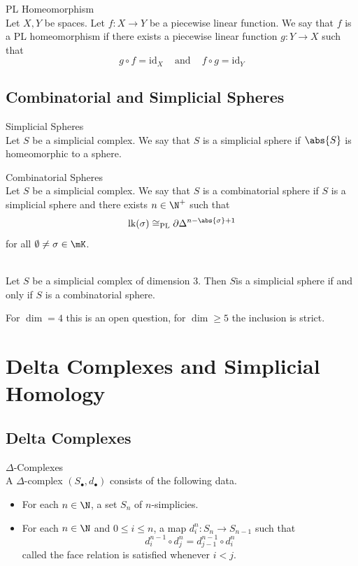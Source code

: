 \documentclass[a4paper]{article}
\begin{document}
\begin{defn}{PL Homeomorphism}{}\\
Let $X,Y$ be spaces. Let $f:X\to Y$ be a piecewise linear function. We say that $f$ is a PL homeomorphism if there exists a piecewise linear function $g:Y\to X$ such that $$g\circ f=\text{id}_X\;\;\;\text{ and }\;\;\;f\circ g=\text{id}_Y$$
\end{defn}

\subsection{Combinatorial and Simplicial Spheres}
\begin{defn}{Simplicial Spheres}{}\\
Let $S$ be a simplicial complex. We say that $S$ is a simplicial sphere if $\abs{S}$ is homeomorphic to a sphere. 
\end{defn}

\begin{defn}{Combinatorial Spheres}{}\\
Let $S$ be a simplicial complex. We say that $S$ is a combinatorial sphere if $S$ is a simplicial sphere and there exists $n\in\N^+$ such that $$\text{lk}(\sigma)\cong_\text{PL}\partial\Delta^{n-\abs{\sigma}+1}$$ for all $\emptyset\neq\sigma\in\mK$. 
\end{defn}

\begin{prp}{}{}\\
Let $S$ be a simplicial complex of dimension $3$. Then $S$is a simplicial sphere if and only if $S$ is a combinatorial sphere. 
\end{prp}

For $\dim=4$ this is an open question, for $\dim\geq 5$ the inclusion is strict. 

\pagebreak
\section{Delta Complexes and Simplicial Homology}
\subsection{Delta Complexes}
\begin{defn}{$\Delta$-Complexes}{}\\
A $\Delta$-complex $(S_\bullet,d_\bullet)$ consists of the following data. 
\begin{itemize}
\item For each $n\in\N$, a set $S_n$ of $n$-simplicies. 
\item For each $n\in\N$ and $0\leq i\leq n$, a map $d_i^n:S_n\to S_{n-1}$ such that $$d_i^{n-1}\circ d_j^n=d_{j-1}^{n-1}\circ d_i^n$$ called the face relation is satisfied whenever $i<j$. 
\end{itemize}
\end{defn}
\end{document}
